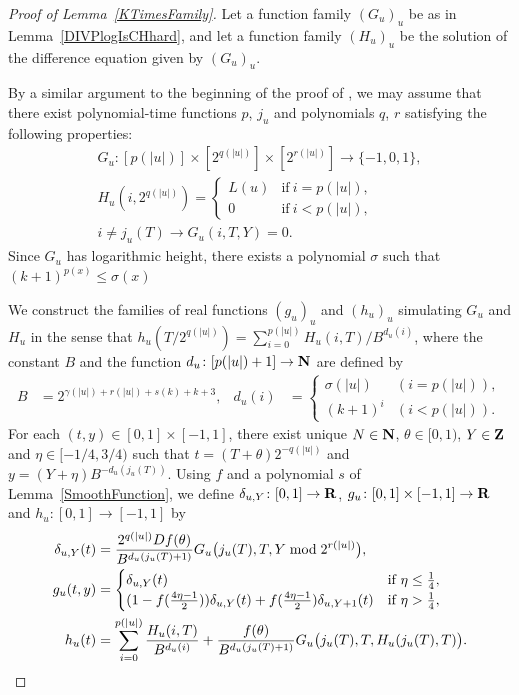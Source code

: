 \begin{proof}[Proof of Lemma~\ref{KTimesFamily}]
Let a function family $(G_u)_u$ be as in Lemma~\ref{DIVPlogIsCHhard},
and let a function family $(H_u)_u$ be the solution of the difference equation given by $(G_u)_u$.

By a similar argument to the beginning of the proof of \cite[Lemma 4.1]{kawamura2010lipschitz},
we may assume that there exist polynomial-time functions $p$, $j_u$
and polynomials $q$, $r$ satisfying the following properties:
\begin{gather}
 G_u \colon [p(|u|)] \times [2^{q(|u|)}] \times [2^{r(|u|)}] \to \{-1, 0, 1\},
 \\
 H_u(i, 2^{q(|u|)}) = \begin{cases}
		       L(u) & \text{if} \ i=p(|u|), \\
		       0 & \text{if} \ i<p(|u|), 
		      \end{cases}
 \\
 i \not = j_u(T)  \to G_u(i, T, Y) = 0.
\end{gather}
Since $G_u$ has logarithmic height,
there exists a polynomial $\sigma$ such that $(k+1)^{p(x)} \le \sigma(x)$


We construct the families of real functions $(g_u)_u$ and $(h_u)_u$ simulating $G _u$ and $H _u$ 
in the sense that $h_u(T/2^{q(|u|)}) = \sum^{p(|u|)}_{i = 0}H_u(i, T)/B^{d_u(i)}$, 
where the constant $B$ and the function $d_u \colon [p(|u|)+1] \to \mathbf N$ are 
defined by
  \begin{align}
   B &= 2^{\gamma(|u|) + r(|u|) + s(k) + k + 3}, 
   &
   d_u(i) &= 
   \begin{cases}
    \sigma(|u|) & (i=p(|u|)), 
    \\
    (k+1)^i & (i<p(|u|)).
   \end{cases}
  \end{align}
For each $(t, y) \in [0,1] \times [-1, 1]$,
there exist unique $N \in \mathbf N$, $\theta \in [0,1)$, $Y \in \mathbf Z$ and $\eta \in [-1/4, 3/4)$
such that $t = (T + \theta)2^{-q(|u|)}$ and $y = (Y + \eta)B^{-d_u(j_u(T))}$.
Using $f$ and a polynomial $s$ of Lemma~\ref{SmoothFunction},
we define 
$\delta_{u,Y} \colon [0,1] \to \mathbf R$,
$
g _u \colon [0, 1] \times [-1, 1] \to \mathbf R
$ and $
h _u \colon [0, 1] \to [-1, 1]
$ by
  \begin{align}
    \label{eq:delta}
   \delta_{u, Y} (t) &= \frac{2^{q(|u|)} D f(\theta)}{B^{d_u(j_u(T)+1)}} 
   G_u \bigl( j_u(T), T, Y \bmod 2^{r(|u|)} \bigr),
   \\
  \label{eq:gu}
  g_u(t,y) 
  &= \begin{cases}
     \delta_{u, Y}(t)
     & \text{if} \ \eta \le \frac 1 4, 
     \\
     ( 1-f ( \frac{4\eta-1}{2})) \delta_{u, Y}(t)
     + f ( \frac{4\eta-1}{2}) \delta_{u,Y+1}(t)
     & \text{if} \ \eta > \frac 1 4,
    \end{cases}
   \\
  h_u(t) 
   &= \sum^{p(|u|)}_{i=0} \frac{H_u(i, T)}{B^{d_u(i)}}  
  + \frac{f(\theta)}{B^{d_u(j_u(T)+1)}} G_u \bigl( j_u(T), T, H_u(j_u(T), T) \bigr) .
  \label{eq:hu}
  \end{align}


\end{proof}
